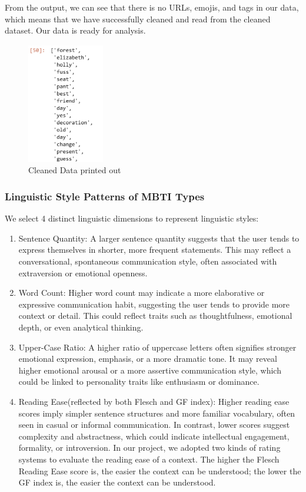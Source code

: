 \documentclass[12pt]{article}
\numberwithin{figure}{section}  %
\begin{document}
	From the output, we can see that there is no URLs, emojis, and tags in our
	data, which means that we have successfully cleaned and read from the
	cleaned dataset. Our data is ready for analysis.
	\begin{figure}[H]
		\centering
		\includegraphics[width=0.3\textwidth]{Q2VADER1} 
		\caption{Cleaned Data printed out}		
	\end{figure}
	
	\subsubsection{Linguistic Style Patterns of MBTI Types}
	We select 4 distinct linguistic dimensions to represent linguistic styles:
	\begin{enumerate}
		\item Sentence Quantity: A larger sentence quantity suggests that the
		user tends to express themselves in shorter, more frequent statements.
		This may reflect a conversational, spontaneous communication style,
		often associated with extraversion or emotional openness.  
		\item Word Count: Higher word count may indicate a more elaborative or
		expressive communication habit, suggesting the user tends to provide
		more context or detail. This could reflect traits such as
		thoughtfulness, emotional depth, or even analytical thinking.
		\item Upper-Case Ratio: A higher ratio of uppercase letters often
		signifies stronger emotional expression, emphasis, or a more dramatic
		tone. It may reveal higher emotional arousal or a more assertive
		communication style, which could be linked to personality traits like
		enthusiasm or dominance. %
		\item Reading Ease(reflected by both Flesch and GF index): Higher reading
		ease scores imply simpler sentence structures and more familiar
		vocabulary, often seen in casual or informal communication. In contrast,
		lower scores suggest complexity and abstractness, which could indicate
		intellectual engagement, formality, or introversion. In our project, we
		adopted two kinds of rating systems to evaluate the reading ease of a
		context. The higher the Flesch Reading Ease score is, the easier the
		context can be understood; the lower the GF index is, the easier the
		context can be understood.
	\end{enumerate}
	
\end{document}
